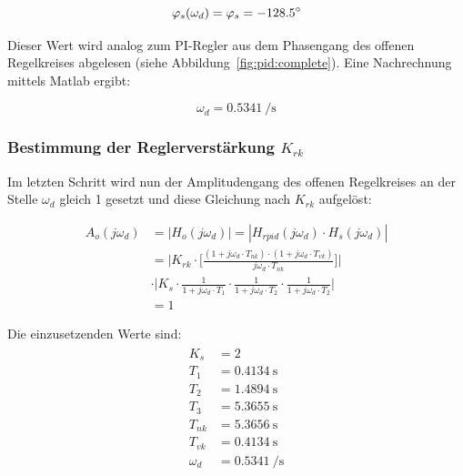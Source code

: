 \begin{equation} \label{eq:pid:omega_d_target}
    \varphi_s(\omega_d) = \varphi_s = -128.5\degree
\end{equation}

Dieser   Wert   wird   analog   zum   PI-Regler   aus   dem   Phasengang   des
offenen Regelkreises  abgelesen (siehe Abbildung~\ref{fig:pid:complete}). Eine
Nachrechnung mittels Matlab ergibt:

\begin{equation} \label{eq:pid:omega_d_target}
    \omega_d = \SI{0.5341}{\per\second}
\end{equation}


\subsubsection{Bestimmung der Reglerverst\"arkung $K_{rk}$}

Im letzten  Schritt wird  nun der Amplitudengang  des offenen  Regelkreises an
der  Stelle $\omega_d$  gleich 1  gesetzt  und diese  Gleichung nach  $K_{rk}$
aufgel\"ost:

\begin{equation} \label{eq:pid:h_o_k_rk_one}
    \begin{split}
        A_{o}(j\omega_d)    & = | H_{o}(j\omega_d) | = | H_{rpid}(j\omega_d) \cdot H_s(j\omega_d) |    \\
                            & = \Biggl \rvert
                                    K_{rk}
                                    \cdot
                                    \biggl[ \frac{(1 + j\omega_d \cdot T_{nk}) \cdot (1 + j\omega_d \cdot T_{vk}) }{ j\omega_d \cdot T_{nk} } \biggr] \Biggr \rvert \\
                            & \cdot
                                \Biggl \rvert
                                    K_s
                                    \cdot \frac{1}{1 + j\omega_d \cdot T_1}
                                    \cdot \frac{1}{1 + j\omega_d \cdot T_2}
                                    \cdot \frac{1}{1 + j\omega_d \cdot T_2}
                                    \Biggr \rvert \\
                            & = 1
    \end{split}
\end{equation}

Die einzusetzenden Werte sind:
\begin{gather} \label{eq:pid:h_o_k_rk_one}
    \begin{split}
        K_s         & = 2                        \\
        T_1         & = \SI{0.4134}{\second}     \\
        T_2         & = \SI{1.4894}{\second}     \\
        T_3         & = \SI{5.3655}{\second}     \\
        T_{nk}      & = \SI{5.3656}{\second}     \\
        T_{vk}      & = \SI{0.4134}{\second}     \\
        \omega_d    & = \SI{0.5341}{\per\second}
    \end{split}
\end{gather}

